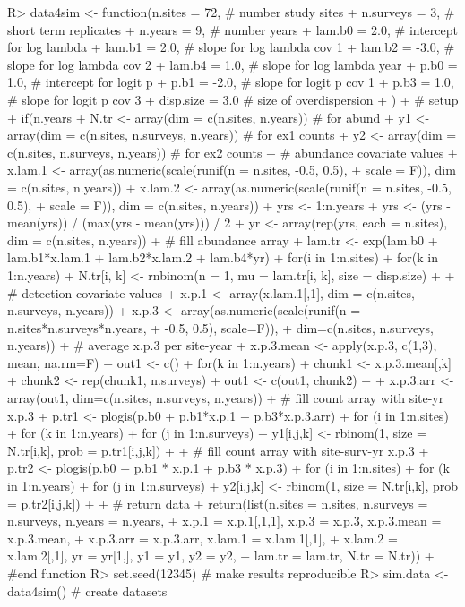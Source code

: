 \documentclass[article]{jss}
\begin{document}
\begin{Code}
R> data4sim <- function(n.sites = 72,   # number study sites
+                       n.surveys = 3,  # short term replicates
+                       n.years = 9,    # number years
+                       lam.b0 = 2.0,   # intercept for log lambda
+                       lam.b1 = 2.0,   # slope for log lambda cov 1
+                       lam.b2 = -3.0,  # slope for log lambda cov 2
+                       lam.b4 = 1.0,   # slope for log lambda year
+                       p.b0 = 1.0,     # intercept for logit p
+                       p.b1 = -2.0,    # slope for logit p cov 1
+                       p.b3 = 1.0,     # slope for logit p cov 3
+                       disp.size = 3.0 # size of overdispersion
+                       ){
+  # setup
+  if(n.years %
+  N.tr <- array(dim = c(n.sites, n.years))           # for abund
+  y1 <- array(dim = c(n.sites, n.surveys, n.years))  # for ex1 counts
+  y2 <- array(dim = c(n.sites, n.surveys, n.years))  # for ex2 counts
+  # abundance covariate values
+  x.lam.1 <- array(as.numeric(scale(runif(n = n.sites, -0.5, 0.5), 
+                   scale = F)), dim = c(n.sites, n.years))
+  x.lam.2 <- array(as.numeric(scale(runif(n = n.sites, -0.5, 0.5), 
+                   scale = F)), dim = c(n.sites, n.years))
+  yrs <- 1:n.years
+  yrs <- (yrs - mean(yrs)) / (max(yrs - mean(yrs))) / 2
+  yr <- array(rep(yrs, each = n.sites), dim = c(n.sites, n.years))
+  # fill abundance array
+  lam.tr <- exp(lam.b0 + lam.b1*x.lam.1 + lam.b2*x.lam.2 + lam.b4*yr)
+  for(i in 1:n.sites){
+    for(k in 1:n.years){
+    N.tr[i, k] <- rnbinom(n = 1, mu = lam.tr[i, k], size = disp.size)
+  }}
+  # detection covariate values
+  x.p.1 <- array(x.lam.1[,1], dim = c(n.sites, n.surveys, n.years))
+  x.p.3 <- array(as.numeric(scale(runif(n = n.sites*n.surveys*n.years, 
+                                        -0.5, 0.5), scale=F)), 
+                 dim=c(n.sites, n.surveys, n.years))
+  # average x.p.3 per site-year
+  x.p.3.mean <- apply(x.p.3, c(1,3), mean, na.rm=F)
+  out1 <- c()
+  for(k in 1:n.years){
+   chunk1 <- x.p.3.mean[,k]
+   chunk2 <- rep(chunk1, n.surveys)
+   out1 <- c(out1, chunk2)
+  }
+  x.p.3.arr <- array(out1, dim=c(n.sites, n.surveys, n.years))
+  # fill count array with site-yr x.p.3
+  p.tr1 <- plogis(p.b0 + p.b1*x.p.1 + p.b3*x.p.3.arr)
+  for (i in 1:n.sites){
+    for (k in 1:n.years){
+      for (j in 1:n.surveys){
+        y1[i,j,k] <- rbinom(1, size = N.tr[i,k], prob = p.tr1[i,j,k])
+  }}}
+  # fill count array with site-surv-yr x.p.3
+  p.tr2 <- plogis(p.b0 + p.b1 * x.p.1 + p.b3 * x.p.3)
+  for (i in 1:n.sites){
+    for (k in 1:n.years){
+      for (j in 1:n.surveys){
+        y2[i,j,k] <- rbinom(1, size = N.tr[i,k], prob = p.tr2[i,j,k])
+  }}}
+  # return data
+  return(list(n.sites = n.sites, n.surveys = n.surveys, n.years = n.years,
+              x.p.1 = x.p.1[,1,1], x.p.3 = x.p.3, x.p.3.mean = x.p.3.mean,
+              x.p.3.arr = x.p.3.arr, x.lam.1 = x.lam.1[,1],
+              x.lam.2 = x.lam.2[,1], yr = yr[1,], y1 = y1, y2 = y2,
+              lam.tr = lam.tr, N.tr = N.tr))
+  } #end function
R> set.seed(12345) # make results reproducible
R> sim.data <- data4sim() # create datasets
\end{Code}
\end{document}
